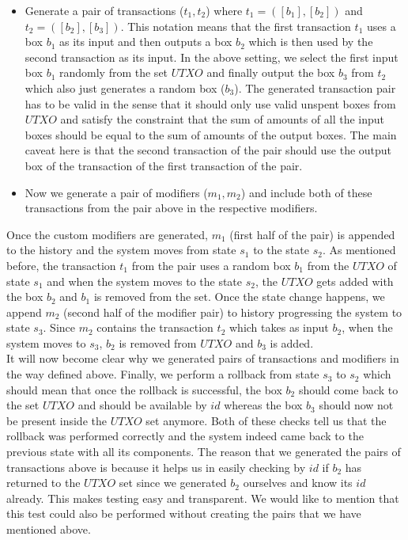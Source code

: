 \begin{enumerate}[\IEEEsetlabelwidth{Z}]
\begin{itemize}[]
\begin{itemize}
\item Generate a pair of transactions ($t_1, t_2$) where $t_1 = ([b_{1}], [b_{2}])$ and $t_2 = ([b_{2}], [b_{3}])$. This notation means that the first transaction $t_1$ uses a box $b_1$ as its input and then outputs a box $b_2$ which is then used by the second transaction as its input. In the above setting, we select the first input box $b_1$ randomly from the set $UTXO$ and finally output the box $b_3$ from $t_2$ which also just generates a random box ($b_3$). The generated transaction pair has to be valid in the sense that it should only use valid unspent boxes from $UTXO$ and satisfy the constraint that the sum of amounts of all the input boxes should be equal to the sum of amounts of the output boxes. The main caveat here is that the second transaction of the pair should use the output box of the transaction of the first transaction of the pair.
\item Now we generate a pair of modifiers ($m_1, m_2$) and include both of these transactions from the pair above in the respective modifiers.
\end{itemize}

Once the custom modifiers are generated, $m_1$ (first half of the pair) is appended to the history and the system moves from state $s_1$ to the state $s_2$. As mentioned before, the transaction $t_1$ from the pair uses a random box $b_1$ from the $UTXO$ of state $s_1$ and when the system moves to the state $s_2$, the $UTXO$ gets added with the box $b_2$ and $b_1$ is removed from the set. Once the state change happens, we append $m_2$ (second half of the modifier pair) to history progressing the system to state $s_3$. Since $m_2$ contains the transaction $t_2$ which takes as input $b_2$, when the system moves to $s_3$, $b_2$ is removed from $UTXO$ and $b_3$ is added.\\

It will now become clear why we generated pairs of transactions and modifiers in the way defined above. Finally, we perform a rollback from state $s_3$ to $s_2$ which should mean that once the rollback is successful, the box $b_2$ should come back to the set $UTXO$ and should be available by $id$ whereas the box $b_3$ should now not be present inside the $UTXO$ set anymore. Both of these checks tell us that the rollback was performed correctly and the system indeed came back to the previous state with all its components. The reason that we generated the pairs of transactions above is because it helps us in easily checking by $id$ if $b_2$ has returned to the $UTXO$ set since we generated $b_2$ ourselves and know its $id$ already. This makes testing easy and transparent. We would like to mention that this test could also be performed without creating the pairs that we have mentioned above.


\end{itemize}
\end{enumerate}
